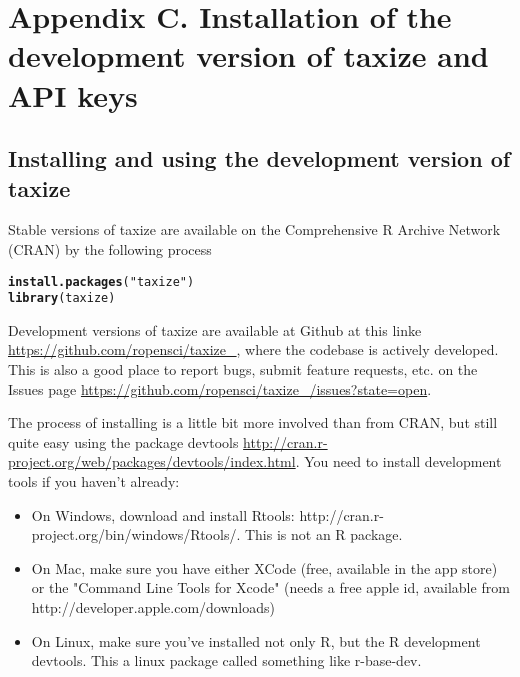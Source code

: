 \documentclass[letterpaper,superscriptaddress,showkeys,longbibliography]{revtex4-1}\usepackage[]{graphicx}\usepackage[]{color}
\makeatletter
\newcommand{\hlstr}[1]{\textcolor[rgb]{0.192,0.494,0.8}{#1}}%
\newcommand{\hlstd}[1]{\textcolor[rgb]{0.345,0.345,0.345}{#1}}%
\newcommand{\hlkwd}[1]{\textcolor[rgb]{0.737,0.353,0.396}{\textbf{#1}}}%
\newenvironment{kframe}{%
 \def\at@end@of@kframe{}%
 \ifinner\ifhmode%
  \def\at@end@of@kframe{\end{minipage}}%
  \begin{minipage}{\columnwidth}%
 \fi\fi%
 \def\FrameCommand##1{\hskip\@totalleftmargin \hskip-\fboxsep
 \colorbox{shadecolor}{##1}\hskip-\fboxsep
     \hskip-\linewidth \hskip-\@totalleftmargin \hskip\columnwidth}%
 \MakeFramed {\advance\hsize-\width
   \@totalleftmargin\z@ \linewidth\hsize
   \@setminipage}}%
 {\par\unskip\endMakeFramed%
 \at@end@of@kframe}
\newenvironment{knitrout}{}{} %
\makeatother
\begin{document}
\section*{Appendix C. Installation of the development version of taxize and API keys} 

\subsection*{Installing and using the development version of taxize}

Stable versions of taxize are available on the Comprehensive R Archive Network (CRAN) by the following process 

\begin{knitrout}
\color{fgcolor}\begin{kframe}
\begin{alltt}
\hlkwd{install.packages}\hlstd{(}\hlstr{"taxize"}\hlstd{)}
\hlkwd{library}\hlstd{(taxize)}
\end{alltt}
\end{kframe}
\end{knitrout}


Development versions of taxize are available at Github at this linke \url{https://github.com/ropensci/taxize_}, where the codebase is actively developed. This is also a good place to report bugs, submit feature requests, etc. on the Issues page \url{https://github.com/ropensci/taxize_/issues?state=open}. 

The process of installing is a little bit more involved than from CRAN, but still quite easy using the package devtools \url{http://cran.r-project.org/web/packages/devtools/index.html}. You need to install development tools if you haven't already:

\begin{itemize}
  \item On Windows, download and install Rtools: http://cran.r-project.org/bin/windows/Rtools/. This is not an R package.
  \item On Mac, make sure you have either XCode (free, available in the app store) or the "Command Line Tools for Xcode" (needs a free apple id, available from http://developer.apple.com/downloads)
  \item On Linux, make sure you've installed not only R, but the R development devtools. This a linux package called something like r-base-dev.
\end{itemize}
\end{document}
